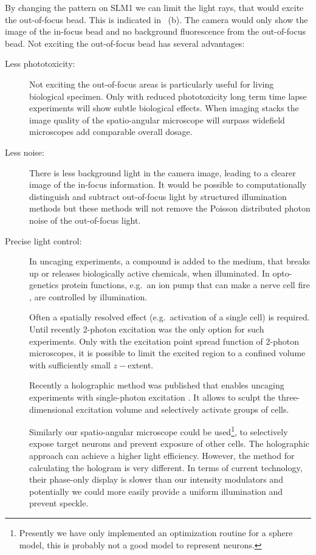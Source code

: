 By changing the pattern on SLM1 we can limit the light rays, that
would excite the out-of-focus bead. This is indicated in
~(b). The camera would only show the image
of the in-focus bead and no background fluorescence from the
out-of-focus bead. Not exciting the out-of-focus bead has several
advantages:
\begin{description}
\item[Less phototoxicity:] Not exciting the out-of-focus areas is
  particularly useful for living biological specimen. Only with
  reduced phototoxicity long term time lapse experiments will show
  subtle biological effects. When imaging stacks the image quality of
  the spatio-angular microscope will surpass widefield microscopes add
  comparable overall dosage.
\item[Less noise:] There is less background light in the camera image,
  leading to a clearer image of the in-focus information. It would be
  possible to computationally distinguish and subtract out-of-focus
  light by structured illumination methods but these methods will not
  remove the Poisson distributed photon noise of the out-of-focus
  light.
\item[Precise light control:] In uncaging experiments, a compound is
  added to the medium, that breaks up or releases biologically active
  chemicals, when illuminated. In opto-genetics protein functions,
  e.g.\ an ion pump that can make a nerve cell fire \cite{Nagel2003},
  are controlled by illumination.

  Often a spatially resolved effect (e.g.\ activation of a single
  cell) is required. Until recently 2-photon excitation was the only
  option \citep{Pettit1997,Shoham2005} for such experiments. Only with
  the excitation point spread function of 2-photon microscopes, it is
  possible to limit the excited region to a confined volume with
  sufficiently small $z-$extent.

  Recently a holographic method was published that enables uncaging
  experiments with single-photon excitation \citep{Zahid2010}. It
  allows to sculpt the three-dimensional excitation volume and
  selectively activate groups of cells.

  Similarly our spatio-angular microscope could be
  used\footnote{Presently we have only implemented an optimization
    routine for a sphere model, this is probably not a good model to
    represent neurons.}, to selectively expose target neurons and
  prevent exposure of other cells. The holographic approach can
  achieve a higher light efficiency. However, the method for
  calculating the hologram is very different. In terms of current
  technology, their phase-only display is slower than our intensity
  modulators and potentially we could more easily provide a uniform
  illumination and prevent speckle.
\end{description}


